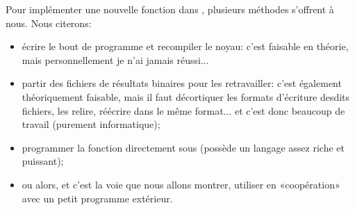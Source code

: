 \medskip
Pour implémenter une nouvelle fonction dans \ansys, plusieurs méthodes s'offrent à nous. Nous citerons:
\begin{itemize}
  \item écrire le bout de programme et recompiler le noyau: c'est faisable en théorie, mais personnellement je n'ai jamais réussi...
  \item partir des fichiers de résultats binaires pour les retravailler: c'est également théoriquement faisable, mais 	il faut décortiquer les formats d'écriture desdits fichiers, les relire, réécrire dans le même format... et c'est donc beaucoup de travail (purement informatique);
  \item programmer la fonction directement sous \ansys (\ansys possède un langage assez riche et puissant);
  \item ou alors, et c'est la voie que nous allons montrer, utiliser \ansys en «coopération» avec un petit programme extérieur.
\end{itemize}

